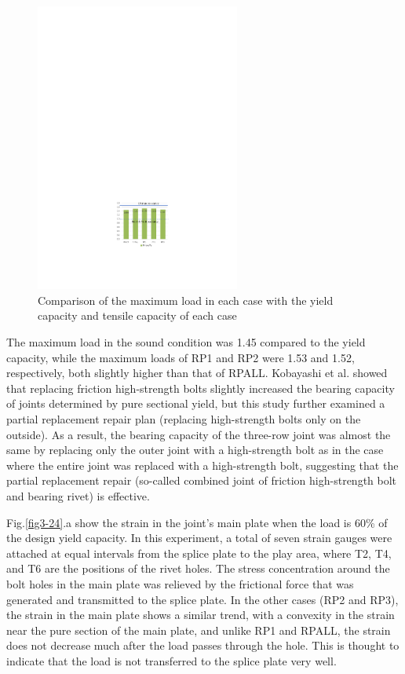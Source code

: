 \begin{figure}[htbp]
    \centering
    \includegraphics[width=0.6\textwidth]{imgs/ch3/fig3-23.pdf}
    \caption{Comparison of the maximum load in each case with the yield capacity and tensile capacity of each case}
    \label{fig3-23}
\end{figure}

The maximum load in the sound condition was 1.45 compared to the yield capacity, while the maximum loads of RP1 and RP2 were 1.53 and 1.52, respectively, both slightly higher than that of RPALL. Kobayashi et al. \cite{KOMATSU2015} showed that replacing friction high-strength bolts slightly increased the bearing capacity of joints determined by pure sectional yield, but this study further examined a partial replacement repair plan (replacing high-strength bolts only on the outside). As a result, the bearing capacity of the three-row joint was almost the same by replacing only the outer joint with a high-strength bolt as in the case where the entire joint was replaced with a high-strength bolt, suggesting that the partial replacement repair (so-called combined joint of friction high-strength bolt and bearing rivet) is effective.

Fig.\ref{fig3-24}.a show the strain in the joint's main plate when the load is 60\% of the design yield capacity. In this experiment, a total of seven strain gauges were attached at equal intervals from the splice plate to the play area, where T2, T4, and T6 are the positions of the rivet holes. The stress concentration around the bolt holes in the main plate was relieved by the frictional force that was generated and transmitted to the splice plate. In the other cases (RP2 and RP3), the strain in the main plate shows a similar trend, with a convexity in the strain near the pure section of the main plate, and unlike RP1 and RPALL, the strain does not decrease much after the load passes through the hole. This is thought to indicate that the load is not transferred to the splice plate very well.


